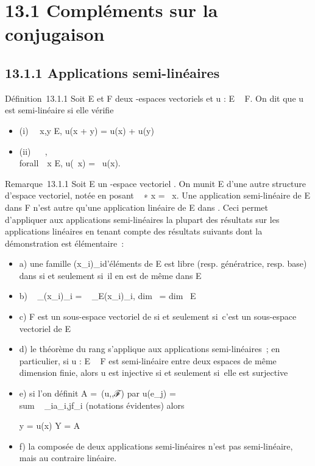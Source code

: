 
\section{13.1 Compléments sur la conjugaison}

\subsection{13.1.1 Applications semi-linéaires}

Définition~13.1.1 Soit E et F deux -espaces vectoriels et u : E \rightarrow~ F. On
dit que u est semi-linéaire si elle vérifie

\begin{itemize}
\itemsep1pt\parskip0pt
\item
  (i) \forall~~x,y \in E, u(x + y) = u(x) + u(y)
\item
  (ii) \forall~\lambda~ \in {}, \\forall~~x \in
  E, u(\lambda~x) = \overline\lambda~u(x).
\end{itemize}

Remarque~13.1.1 Soit E un -espace vectoriel . On munit E d'une autre
structure d'espace vectoriel, notée \checkE en posant
\lambda~ ∗ x = \overline\lambda~x. Une application semi-linéaire de
E dans F n'est autre qu'une application linéaire de E dans
\checkF. Ceci permet d'appliquer aux applications
semi-linéaires la plupart des résultats sur les applications linéaires
en tenant compte des résultats suivants dont la démonstration est
élémentaire~:

\begin{itemize}
\item
  a) une famille (x_i)_i\inI d'éléments de E est libre
  (resp. génératrice, resp. base) dans \checkE si et
  seulement si~il en est de même dans E
\item
  b) \mathrmrg~
  _\checkE(x_i)_i\inI
  = \mathrmrg~
  _E(x_i)_i\inI, dim~
  \checkE = dim~ E
\item
  c) F est un sous-espace vectoriel de \checkE si et
  seulement si~c'est un sous-espace vectoriel de E
\item
  d) le théorème du rang s'applique aux applications semi-linéaires~; en
  particulier, si u : E \rightarrow~ F est semi-linéaire entre deux espaces de même
  dimension finie, alors u est injective si et seulement si~elle est
  surjective
\item
  e) si l'on définit A =\
  \mathrmMat (u,,ℱ) par u(e_j)
  = \\sum ~
  _ia_i,jf_i (notations évidentes) alors

  y = u(x) \Leftrightarrow Y =
  A\overlineX
\item
  f) la composée de deux applications semi-linéaires n'est pas
  semi-linéaire, mais au contraire linéaire.
\end{itemize}

